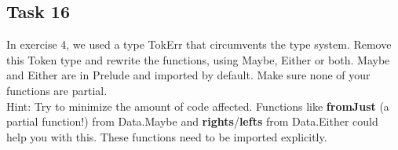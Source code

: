 \documentclass{article}
\begin{document}
\subsection*{Task 16}
In exercise 4, we used a type TokErr that circumvents the type system. Remove this Token type and rewrite the functions, using Maybe, Either or both. Maybe and Either are in Prelude and imported by default. Make sure none of your functions are partial.\\
Hint: Try to minimize the amount of code affected. Functions like \textbf{fromJust} (a partial function!) from Data.Maybe and \textbf{rights}/\textbf{lefts} from Data.Either could help you with this. These functions need to be imported explicitly.
\end{document}
